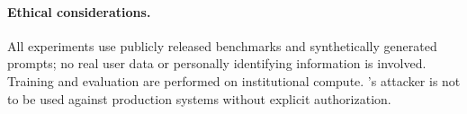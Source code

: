 \paragraph{Ethical considerations.} All experiments use publicly released benchmarks and synthetically generated prompts; no real user data or personally identifying information is involved. Training and evaluation are performed on institutional compute. \method's attacker is not to be used against production systems without explicit authorization.
